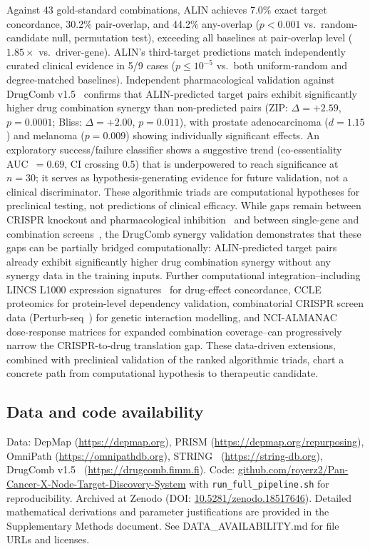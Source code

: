 \documentclass[times, twoside, watermark]{zHenriquesLab-StyleBioRxiv}
\begin{document}
Against 43 gold-standard combinations, ALIN achieves 7.0\% exact target concordance, 30.2\% pair-overlap, and 44.2\% any-overlap ($p < 0.001$ vs.\ random-candidate null, permutation test), exceeding all baselines at pair-overlap level ($1.85\times$ vs.\ driver-gene). ALIN's third-target predictions match independently curated clinical evidence in 5/9 cases ($p \leq 10^{-5}$ vs.\ both uniform-random and degree-matched baselines). Independent pharmacological validation against DrugComb v1.5~\cite{Zagidullin2019,Zheng2022} confirms that ALIN-predicted target pairs exhibit significantly higher drug combination synergy than non-predicted pairs (ZIP: $\Delta = +2.59$, $p = 0.0001$; Bliss: $\Delta = +2.00$, $p = 0.011$), with prostate adenocarcinoma ($d = 1.15$) and melanoma ($p = 0.009$) showing individually significant effects. An exploratory success/failure classifier shows a suggestive trend (co-essentiality AUC~$= 0.69$, CI crossing 0.5) that is underpowered to reach significance at $n = 30$; it serves as hypothesis-generating evidence for future validation, not a clinical discriminator. These algorithmic triads are computational hypotheses for preclinical testing, not predictions of clinical efficacy. While gaps remain between CRISPR knockout and pharmacological inhibition~\cite{Lin2017,Goncalves2020} and between single-gene and combination screens~\cite{Norman2019}, the DrugComb synergy validation demonstrates that these gaps can be partially bridged computationally: ALIN-predicted target pairs already exhibit significantly higher drug combination synergy without any synergy data in the training inputs. Further computational integration--including LINCS L1000 expression signatures~\cite{Subramanian2017} for drug-effect concordance, CCLE proteomics for protein-level dependency validation, combinatorial CRISPR screen data (Perturb-seq~\cite{Norman2019}) for genetic interaction modelling, and NCI-ALMANAC~\cite{Holbeck2017} dose-response matrices for expanded combination coverage--can progressively narrow the CRISPR-to-drug translation gap. These data-driven extensions, combined with preclinical validation of the ranked algorithmic triads, chart a concrete path from computational hypothesis to therapeutic candidate.

\subsection*{Data and code availability}
Data: DepMap (\url{https://depmap.org}), PRISM (\url{https://depmap.org/repurposing}), OmniPath (\url{https://omnipathdb.org}), STRING~\cite{Szklarczyk2025} (\url{https://string-db.org}), DrugComb v1.5~\cite{Zagidullin2019,Zheng2022} (\url{https://drugcomb.fimm.fi}).
Code: \href{https://github.com/royerz2/Pan-Cancer-X-Node-Target-Discovery-System}{github.com/royerz2/Pan-Cancer-X-Node-Target-Discovery-System} with \texttt{run\_full\_pipeline.sh} for reproducibility.
Archived at Zenodo (DOI: \href{https://doi.org/10.5281/zenodo.18517646}{10.5281/zenodo.18517646}).
Detailed mathematical derivations and parameter justifications are provided in the Supplementary Methods document. See DATA\_AVAILABILITY.md for file URLs and licenses.
\end{document}

